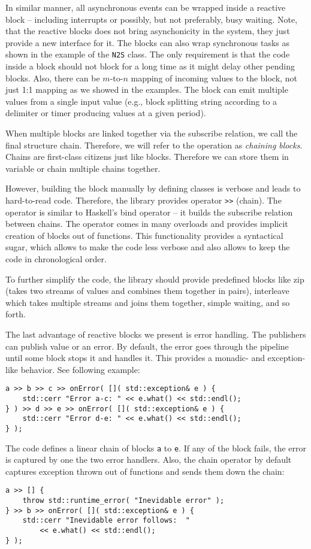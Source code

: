 In similar manner, all asynchronous events can be wrapped inside a reactive
block -- including interrupts or possibly, but not preferably, busy waiting.
Note, that the reactive blocks does not bring asynchonicity in the system, they
just provide a new interface for it. The blocks can also wrap synchronous tasks
as shown in the example of the \texttt{N2S} class. The only requirement is that
the code inside a block should not block for a long time as it might delay other
pending blocks. Also, there can be $m$-to-$n$ mapping of incoming values to the
block, not just 1:1 mapping as we showed in the examples. The block can emit
multiple values from a single input value (e.g., block splitting string
according to a delimiter or timer producing values at a given period).

When multiple blocks are linked together via the subscribe relation, we call the
final structure chain. Therefore, we will refer to the operation as
\emph{chaining blocks}. Chains are first-class citizens just like blocks.
Therefore we can store them in variable or chain multiple chains together.

However, building the block manually by defining classes is verbose and leads to
hard-to-read code. Therefore, the library provides operator
\texttt{>>} (chain). The operator is similar to Haskell's
bind operator -- it builds the subscribe relation between chains. The operator
comes in many overloads and provides implicit creation of blocks out of
functions. This functionality provides a syntactical sugar, which allows to make
the code less verbose and also allows to keep the code in chronological order.

To further simplify the code, the library should provide predefined blocks like
zip (takes two streams of values and combines them together in pairs),
interleave which takes multiple streams and joins them together, simple waiting,
and so forth.

The last advantage of reactive blocks we present is error handling. The
publishers can publish value or an error. By default, the error goes through the
pipeline until some block stops it and handles it. This provides a monadic- and
exception-like behavior. See following example:
\begin{verbatim}
a >> b >> c >> onError( []( std::exception& e ) {
    std::cerr "Error a-c: " << e.what() << std::endl();
} ) >> d >> e >> onError( []( std::exception& e ) {
    std::cerr "Error d-e: " << e.what() << std::endl();
} );
\end{verbatim}
The code defines a linear chain of blocks \texttt{a} to \texttt{e}. If any of
the block fails, the error is captured by one the two error handlers. Also, the
chain operator by default captures exception thrown out of functions and sends
them down the chain:
\begin{verbatim}
a >> [] {
    throw std::runtime_error( "Inevidable error" );
} >> b >> onError( []( std::exception& e ) {
    std::cerr "Inevidable error follows:  "
        << e.what() << std::endl();
} );
\end{verbatim}

